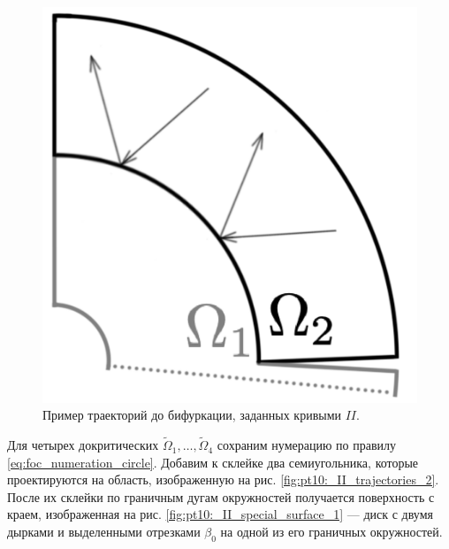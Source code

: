 \begin{figure}[!htb]
\includegraphics[scale=0.1]{images/ch4/section3_circular/atoms/II/before/before_trajectories.pdf}
    \caption{Пример траекторий до бифуркации, заданных кривыми $II$.}
    \label{fig:pt10:_II_before_trajectories}
\endminipage\hfill
\end{figure}

Для четырех докритических $\widetilde{\Omega}_1, \ldots, \widetilde{\Omega}_4$ сохраним нумерацию по правилу \eqref{eq:foc_numeration_circle}. Добавим к склейке два семиугольника, которые проектируются на область, изображенную на рис. \ref{fig:pt10:_II_trajectories_2}. После их склейки по граничным дугам окружностей получается поверхность с краем, изображенная на рис. \ref{fig:pt10:_II_special_surface_1} --- диск с двумя дырками и выделенными отрезками $\beta_0$ на одной из его граничных окружностей.

